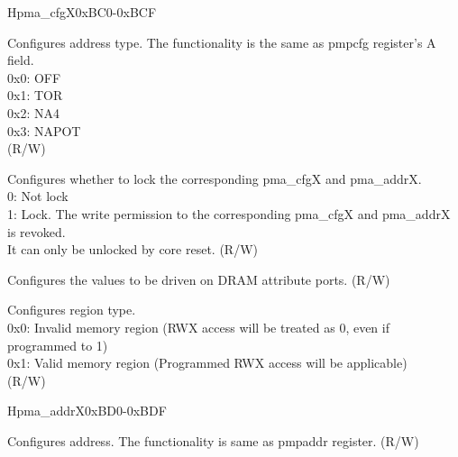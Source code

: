 
\begin{register}{H}{pma\_cfgX}{0xBC0-0xBCF}
\label{regdesc:pma_cfgX}
%
%
%
%
%
%
%
%
\regnewline%
\begin{regdesc}
\begin{reglist}
\label{fielddesc:A}\item [A] Configures address type. The functionality is the same as pmpcfg register's A field.\\
0x0: OFF\\
0x1: TOR\\
0x2: NA4\\
0x3: NAPOT\\
(R/W)
\label{fielddesc:Lock}\item [Lock] Configures whether to lock the corresponding pma\_cfgX and pma\_addrX. \\
0: Not lock\\
1: Lock. The write permission to the corresponding pma\_cfgX and pma\_addrX is revoked.\\
It can only be unlocked by core reset. (R/W)
\label{fielddesc:Attribute}\item [Attribute] Configures the values to be driven on DRAM attribute ports. (R/W)
\label{fielddesc:Type}\item [Type] Configures region type.\\
0x0: Invalid memory region (RWX access will be treated as 0, even if programmed to 1)\\
0x1: Valid memory region (Programmed RWX access will be applicable)\\
(R/W)
\end{reglist}
\end{regdesc}
\end{register}

\begin{register}{H}{pma\_addrX}{0xBD0-0xBDF}
\label{regdesc:pma_addrX}
%
\regnewline%
\begin{regdesc}
\begin{reglist}
\label{fielddesc:Addr}\item [Addr] Configures address. The functionality is same as pmpaddr register. (R/W)
\end{reglist}
\end{regdesc}
\end{register}